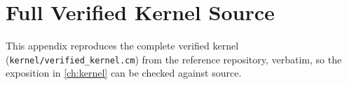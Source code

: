 \chapter{Full Verified Kernel Source}
\label{app:kernel}

This appendix reproduces the complete verified kernel
(\texttt{kernel/verified\_kernel.cm}) from the reference repository, verbatim,
so the exposition in \cref{ch:kernel} can be checked against source.


